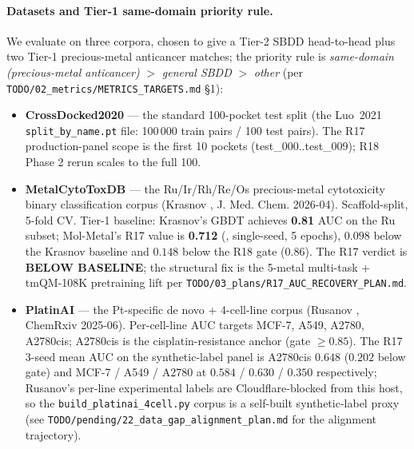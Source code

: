\paragraph{Datasets and Tier-1 same-domain priority rule.}
We evaluate on three corpora, chosen to give a Tier-2 SBDD
head-to-head plus two Tier-1 precious-metal anticancer
matches; the priority rule is
\emph{same-domain (precious-metal anticancer)} $>$ \emph{general
SBDD} $>$ \emph{other} (per \texttt{TODO/02\_metrics/METRICS\_TARGETS.md} §1):
\begin{itemize}
  \item \textbf{CrossDocked2020} \cite{luo2021crossdocked} ---
        the standard 100-pocket test split (the Luo~2021
        \texttt{split\_by\_name.pt} file: 100\,000 train pairs
        / 100 test pairs).  The R17 production-panel scope is
        the first 10 pockets (test\_000..test\_009); R18
        Phase 2 rerun scales to the full 100.
  \item \textbf{MetalCytoToxDB}
        \cite{krasnov2026metalcytotoxdb} --- the Ru/Ir/Rh/Re/Os
        precious-metal cytotoxicity binary classification corpus
        (Krasnov \etal, J. Med. Chem. 2026-04).  Scaffold-split,
        5-fold CV.  Tier-1 baseline: Krasnov's GBDT achieves
        \textbf{0.81} AUC on the Ru subset; Mol-Metal's R17
        value is \textbf{0.712} (\MEASURED{}, single-seed,
        5 epochs), $0.098$ below the Krasnov baseline and
        $0.148$ below the R18 gate ($0.86$).  The R17
        verdict is \textbf{BELOW BASELINE}; the structural
        fix is the 5-metal multi-task + tmQM-108K pretraining
        lift per \texttt{TODO/03\_plans/R17\_AUC\_RECOVERY\_PLAN.md}.
  \item \textbf{PlatinAI} \cite{rusanov2025platinai} --- the
        Pt-specific de novo + 4-cell-line corpus (Rusanov \etal,
        ChemRxiv 2025-06).  Per-cell-line AUC targets MCF-7,
        A549, A2780, A2780cis; A2780cis is the
        cisplatin-resistance anchor (gate $\geq 0.85$).  The
        R17 3-seed mean AUC on the synthetic-label panel is
        A2780cis $0.648$ \MEASURED{} ($0.202$ below gate) and
        MCF-7 / A549 / A2780 at $0.584$ / $0.630$ / $0.350$
        respectively; Rusanov's per-line experimental labels
        are Cloudflare-blocked from this host, so the
        \texttt{build\_platinai\_4cell.py} corpus is a
        self-built synthetic-label proxy (see
        \texttt{TODO/pending/22\_data\_gap\_alignment\_plan.md}
        for the alignment trajectory).
\end{itemize}

